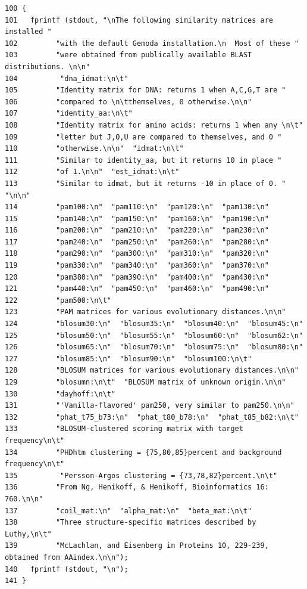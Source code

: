 \scriptsize\begin{verbatim}100 {
101   fprintf (stdout, "\nThe following similarity matrices are installed " 
102         "with the default Gemoda installation.\n  Most of these " 
103         "were obtained from publically available BLAST distributions. \n\n"
104          "dna_idmat:\n\t" 
105         "Identity matrix for DNA: returns 1 when A,C,G,T are " 
106         "compared to \n\tthemselves, 0 otherwise.\n\n" 
107         "identity_aa:\n\t" 
108         "Identity matrix for amino acids: returns 1 when any \n\t" 
109         "letter but J,O,U are compared to themselves, and 0 " 
110         "otherwise.\n\n"  "idmat:\n\t" 
111         "Similar to identity_aa, but it returns 10 in place " 
112         "of 1.\n\n"  "est_idmat:\n\t" 
113         "Similar to idmat, but it returns -10 in place of 0. "  "\n\n" 
114         "pam100:\n"  "pam110:\n"  "pam120:\n"  "pam130:\n" 
115         "pam140:\n"  "pam150:\n"  "pam160:\n"  "pam190:\n" 
116         "pam200:\n"  "pam210:\n"  "pam220:\n"  "pam230:\n" 
117         "pam240:\n"  "pam250:\n"  "pam260:\n"  "pam280:\n" 
118         "pam290:\n"  "pam300:\n"  "pam310:\n"  "pam320:\n" 
119         "pam330:\n"  "pam340:\n"  "pam360:\n"  "pam370:\n" 
120         "pam380:\n"  "pam390:\n"  "pam400:\n"  "pam430:\n" 
121         "pam440:\n"  "pam450:\n"  "pam460:\n"  "pam490:\n" 
122         "pam500:\n\t" 
123         "PAM matrices for various evolutionary distances.\n\n" 
124         "blosum30:\n"  "blosum35:\n"  "blosum40:\n"  "blosum45:\n" 
125         "blosum50:\n"  "blosum55:\n"  "blosum60:\n"  "blosum62:\n" 
126         "blosum65:\n"  "blosum70:\n"  "blosum75:\n"  "blosum80:\n" 
127         "blosum85:\n"  "blosum90:\n"  "blosum100:\n\t" 
128         "BLOSUM matrices for various evolutionary distances.\n\n" 
129         "blosumn:\n\t"  "BLOSUM matrix of unknown origin.\n\n" 
130         "dayhoff:\n\t" 
131         "'Vanilla-flavored' pam250, very similar to pam250.\n\n" 
132         "phat_t75_b73:\n"  "phat_t80_b78:\n"  "phat_t85_b82:\n\t" 
133         "BLOSUM-clustered scoring matrix with target frequency\n\t" 
134         "PHDhtm clustering = {75,80,85}percent and background frequency\n\t"
135          "Persson-Argos clustering = {73,78,82}percent.\n\t" 
136         "From Ng, Henikoff, & Henikoff, Bioinformatics 16: 760.\n\n" 
137         "coil_mat:\n"  "alpha_mat:\n"  "beta_mat:\n\t" 
138         "Three structure-specific matrices described by Luthy,\n\t" 
139         "McLachlan, and Eisenberg in Proteins 10, 229-239, obtained from AAindex.\n\n");
140   fprintf (stdout, "\n");
141 } 
\end{verbatim}
\normalsize 


